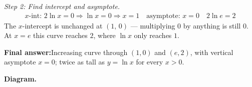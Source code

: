 \documentclass[11pt]{article}
\begin{document}
\textit{Step 2: Find intercept and asymptote.}
\[\begin{gathered}
x\text{-int: } 2\ln x = 0 \Rightarrow \ln x = 0 \Rightarrow x = 1 \quad \text{asymptote: } x = 0 \quad 2\ln e = 2
\end{gathered}\]
The \( x \)-intercept is unchanged at \( (1,\,0) \) --- multiplying \( 0 \) by anything is still \( 0 \). At \( x = e \) this curve reaches \( 2 \), where \( \ln x \) only reaches \( 1 \).

\begin{answerbox}
\textbf{Final answer:}\quad Increasing curve through \(\displaystyle (1, 0)\) and \(\displaystyle (e, 2)\), with vertical asymptote \(\displaystyle  x = 0 \); twice as tall as \(\displaystyle  y = \ln x \) for every \(\displaystyle  x > 0 \).
\end{answerbox}
\textbf{Diagram.}
\end{document}
